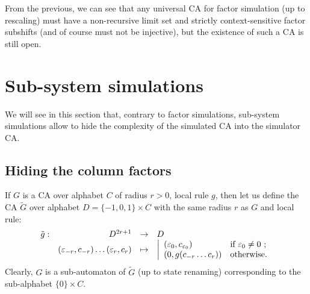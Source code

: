 \documentclass{jac}
\newcommand{\soit}[1]{\left|\everymath{\displaystyle\everymath{}}\begin{array}{ll}#1\end{array}\right.}
\newcommand{\appl}[5]{\begin{array}{rrcl}#1:&#2&\to&#3\\
&#4&\mapsto&\displaystyle#5\end{array}}
\theoremstyle{definition}
\begin{document}
From the previous, we can see that any universal CA for factor simulation (up to rescaling) must have  a non-recursive limit set and strictly context-sensitive factor subshifts (and of course must not be injective), but the existence of such a CA is still open.

\section{Sub-system simulations}\label{s:subsim}
\label{sec:injsimu}

We will see in this section that, contrary to factor simulations, sub-system simulations allow to hide the complexity of the simulated CA into the simulator CA.

\subsection{Hiding the column factors}

If $G$ is a CA over alphabet $C$ of radius $r>0$, local rule $g$, then let us define the CA $\tilde G$ over alphabet $D=\{-1,0,1\}\times C$ with the same radius $r$ as $G$ and  local rule:
\[\appl{\tilde g}{D^{2r+1}}D{(\varepsilon_{-r},c_{-r})\ldots(\varepsilon_r,c_r)}{\soit{(\varepsilon_0,c_{\varepsilon_0})&\textrm{if }\varepsilon_0\ne0~;\\(0,g(c_{-r}\ldots c_r))&\textrm{otherwise}.}}\]
Clearly, $G$ is a sub-automaton of $\tilde G$ (up to state renaming) corresponding to the sub-alphabet $\{0\}\times C$.
\end{document}
